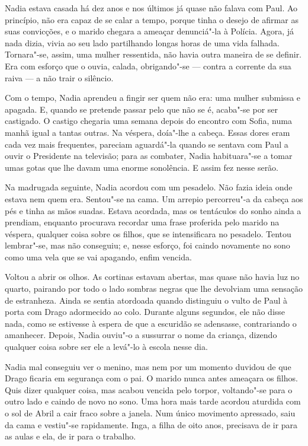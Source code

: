 Nadia estava casada há dez anos e nos últimos já quase não falava com
Paul. Ao princípio, não era capaz de se calar a tempo, porque tinha o
desejo de afirmar as suas convicções, e o marido chegara a ameaçar
denunciá"-la à Polícia. Agora, já nada dizia, vivia ao seu lado partilhando longas horas de uma vida falhada. Tornara"-se, assim, uma mulher
ressentida, não havia outra maneira de se definir. Era com esforço que o
ouvia, calada, obrigando"-se --- contra a corrente da sua raiva --- a não
trair o silêncio.

Com o tempo, Nadia aprendeu a fingir ser quem não era: uma mulher
submissa e apagada. E, quando se pretende passar pelo que não se é,
acaba"-se por ser castigado. O castigo chegaria uma semana depois do
encontro com Sofia, numa manhã igual a tantas outras. Na véspera,
doía"-lhe a cabeça. Essas dores eram cada vez mais frequentes, pareciam
aguardá"-la quando se sentava com Paul a ouvir o Presidente na televisão;
para as combater, Nadia habituara"-se a tomar umas gotas que lhe davam
uma enorme sonolência. E assim fez nesse serão.

Na madrugada seguinte, Nadia acordou com um pesadelo. Não fazia ideia
onde estava nem quem era. Sentou"-se na cama. Um arrepio percorreu"-a da
cabeça aos pés e tinha as mãos suadas. Estava acordada, mas os
tentáculos do sonho ainda a prendiam, enquanto procurava recordar uma
frase proferida pelo marido na véspera, qualquer coisa sobre os filhos,
que se intensificara no pesadelo. Tentou lembrar"-se, mas não conseguiu;
e, nesse esforço, foi caindo novamente no sono como uma vela que se vai
apagando, enfim vencida.

Voltou a abrir os olhos. As cortinas estavam abertas, mas quase não
havia luz no quarto, pairando por todo o lado sombras negras que lhe
devolviam uma sensação de estranheza. Ainda se sentia atordoada quando
distinguiu o vulto de Paul à porta com Drago adormecido ao colo. Durante
alguns segundos, ele não disse nada, como se estivesse à espera de que a
escuridão se adensasse, contrariando o amanhecer. Depois, Nadia
ouviu"-o a sussurrar o nome da criança, dizendo qualquer coisa sobre ser
ele a levá"-lo à escola nesse dia.

Nadia mal conseguiu ver o menino, mas nem por um momento duvidou de que
Drago ficaria em segurança com o pai. O marido nunca antes ameaçara os
filhos. Quis dizer qualquer coisa, mas acabou vencida pelo torpor,
voltando"-se para o outro lado e caindo de novo no sono. Uma hora mais
tarde acordou aturdida com o sol de Abril a cair fraco sobre a janela.
Num único movimento apressado, saiu da cama e vestiu"-se rapidamente.
Inga, a filha de oito anos, precisava de ir para as aulas e ela, de ir
para o trabalho.

